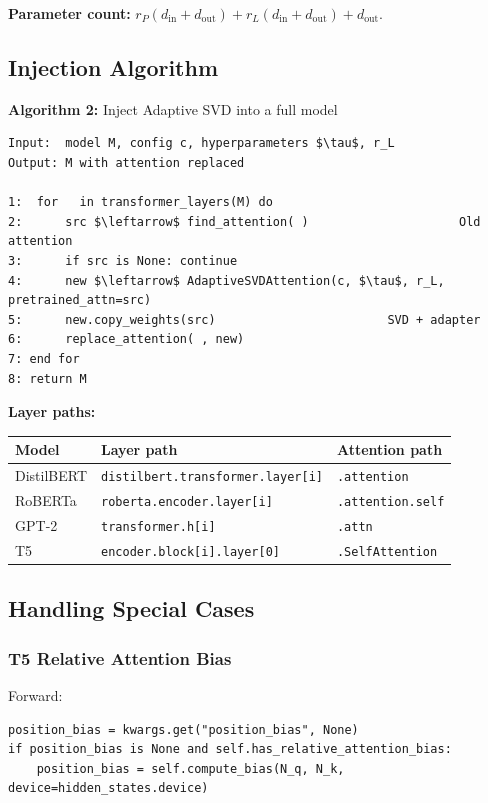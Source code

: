\textbf{Parameter count:} $r_P(d_\text{in} + d_\text{out}) + r_L(d_\text{in} + d_\text{out}) + d_\text{out}$.

\subsection{Injection Algorithm}

\textbf{Algorithm 2:} Inject Adaptive SVD into a full model
\begin{lstlisting}
Input:  model M, config c, hyperparameters $\tau$, r_L
Output: M with attention replaced

1:  for   in transformer_layers(M) do
2:      src $\leftarrow$ find_attention( )                     Old attention
3:      if src is None: continue
4:      new $\leftarrow$ AdaptiveSVDAttention(c, $\tau$, r_L, pretrained_attn=src)
5:      new.copy_weights(src)                        SVD + adapter
6:      replace_attention( , new)
7: end for
8: return M
\end{lstlisting}

\textbf{Layer paths:}

\begin{table}[H]
\centering
\small
\begin{tabular}{lll}
\toprule
\textbf{Model} & \textbf{Layer path} & \textbf{Attention path} \\
\midrule
DistilBERT & \texttt{distilbert.transformer.layer[i]} & \texttt{.attention} \\
RoBERTa & \texttt{roberta.encoder.layer[i]} & \texttt{.attention.self} \\
GPT-2 & \texttt{transformer.h[i]} & \texttt{.attn} \\
T5 & \texttt{encoder.block[i].layer[0]} & \texttt{.SelfAttention} \\
\bottomrule
\end{tabular}
\end{table}

\subsection{Handling Special Cases}

\subsubsection{T5 Relative Attention Bias}

Forward:

\begin{lstlisting}
position_bias = kwargs.get("position_bias", None)
if position_bias is None and self.has_relative_attention_bias:
    position_bias = self.compute_bias(N_q, N_k, device=hidden_states.device)
\end{lstlisting}

